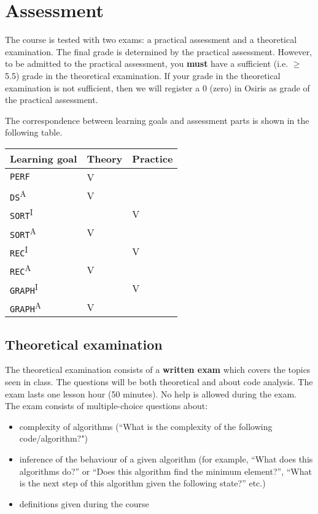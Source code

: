 \section{Assessment}
	The course is tested with two exams: a practical assessment and a theoretical examination. The final grade is determined by the practical assessment. However, to be admitted to the practical assessment, you \textbf{must} have a sufficient (i.e. $\geq$ 5.5) grade in the theoretical examination. If your grade in the theoretical examination is not sufficient, then we will register a 0 (zero) in Osiris as grade of the practical assessment.
	
	The correspondence between learning goals and assessment parts is shown in the following table. \\
	
	\begin{table}[h]
		\centering
	\begin{tabular}{ |l|l|l| }
		\hline
		\textbf{Learning goal} & \textbf{Theory} & \textbf{Practice} \\
		\hline
		\texttt{PERF} & V & \\
		\hline 
		\texttt{DS}\textsuperscript{A} & V & \\
		\hline 
		\texttt{SORT}\textsuperscript{I} & & V \\
		\hline 
		\texttt{SORT}\textsuperscript{A} & V & \\
		\hline 
		\texttt{REC}\textsuperscript{I} & & V \\
		\hline 
		\texttt{REC}\textsuperscript{A} & V &  \\
		\hline 
		\texttt{GRAPH}\textsuperscript{I} & & V \\
		\hline 
		\texttt{GRAPH}\textsuperscript{A} & V & \\
		\hline 
	\end{tabular}
	\end{table}

	\subsection{Theoretical examination}
	The theoretical examination consists of a \textbf{written exam} which covers the topics seen in class. The questions will be both theoretical and about code analysis.
	The exam lasts one lesson hour (50 minutes). No help is allowed during the exam.\\
	
	The exam consists of multiple-choice questions about:
	\begin{itemize}
		\item complexity of algorithms (``What is the complexity of the following code/algorithm?")
		\item inference of the behaviour of a given algorithm (for example, ``What does this algorithms do?'' or ``Does this algorithm find the minimum element?'', ``What is the next step of this algorithm given the following state?'' etc.)
		\item definitions given during the course
	\end{itemize}

